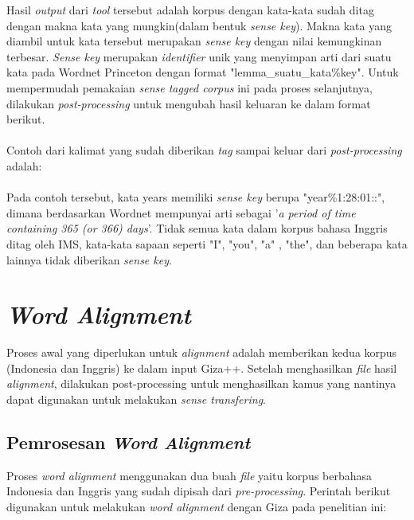 Hasil \textit{output} dari \textit{tool} tersebut adalah korpus dengan kata-kata sudah ditag dengan makna kata yang mungkin(dalam bentuk \textit{sense key}). Makna kata yang diambil untuk kata tersebut merupakan \textit{sense key} dengan nilai kemungkinan terbesar. \textit{Sense key} merupakan \textit{identifier} unik yang menyimpan arti dari suatu kata pada Wordnet Princeton dengan format "lemma\_suatu\_kata\%key". Untuk mempermudah pemakaian \textit{sense tagged corpus} ini pada proses selanjutnya, dilakukan \textit{post-processing} untuk mengubah hasil keluaran ke dalam format berikut.\\

\noindent{}\\

Contoh dari kalimat yang sudah diberikan \textit{tag} sampai keluar dari \textit{post-processing} adalah:\\

\noindent{}\\

Pada contoh tersebut, kata years memiliki \textit{sense key} berupa "year\%1:28:01::", dimana berdasarkan Wordnet mempunyai arti sebagai '\textit{a period of time containing 365 (or 366) days}'. Tidak semua kata dalam korpus bahasa Inggris ditag oleh IMS, kata-kata sapaan seperti "I", "you", "a" , "the", dan beberapa kata lainnya tidak diberikan \textit{sense key}.  



\section{\textit{Word Alignment}}

Proses awal yang diperlukan untuk \textit{alignment} adalah memberikan kedua korpus (Indonesia dan Inggris) ke dalam input Giza++. Setelah menghasilkan \textit{file} hasil \textit{alignment}, dilakukan post-processing untuk menghasilkan kamus yang nantinya dapat digunakan untuk melakukan \textit{sense transfering}.

\subsection{Pemrosesan \textit{Word Alignment}}
Proses \textit{word alignment} menggunakan dua buah \textit{file} yaitu korpus berbahasa Indonesia dan Inggris yang sudah dipisah dari \textit{pre-processing}. Perintah berikut digunakan untuk melakukan \textit{word alignment} dengan Giza pada penelitian ini:

